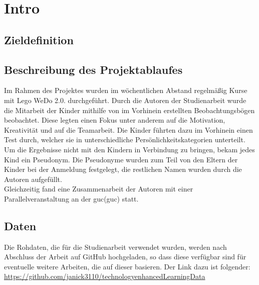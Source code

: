 \chapter{Intro}


\section{Zieldefinition}
\cite{SevenHCIGrandChallenges}




\section{Beschreibung des Projektablaufes}
Im Rahmen des Projektes wurden im wöchentlichen Abstand regelmäßig Kurse mit Lego WeDo 2.0. durchgeführt. Durch die Autoren der Studienarbeit wurde die Mitarbeit der Kinder mithilfe von im Vorhinein erstellten Beobachtungsbögen beobachtet. Diese legten einen Fokus unter anderem auf die Motivation, Kreativität und auf die Teamarbeit. Die Kinder führten dazu im Vorhinein einen Test durch, welcher sie in unterschiedliche Persönlichkeitskategorien unterteilt. Um die Ergebnisse nicht mit den Kindern in Verbindung zu bringen, bekam jedes Kind ein Pseudonym. Die Pseudonyme wurden zum Teil von den Eltern der Kinder bei der Anmeldung festgelegt, die restlichen Namen wurden durch die Autoren aufgefüllt.\\
Gleichzeitig fand eine Zusammenarbeit der Autoren mit einer Parallelveranstaltung an der \acrlong{guc}(\acrshort{guc}) statt.\\


\section{Daten}
Die Rohdaten, die für die Studienarbeit verwendet wurden, werden nach Abschluss der Arbeit auf GitHub hochgeladen, so dass diese verfügbar sind für eventuelle weitere Arbeiten, die auf dieser basieren. Der Link dazu ist folgender: \url{https://github.com/janick3110/technologyenhancedLearningData}